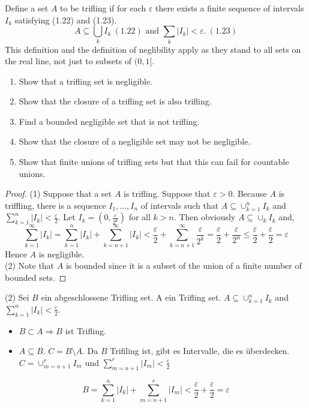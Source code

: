 \documentclass[11pt]{article}
\newcommand{\seq}{\subseteq}
\newcommand{\e}{\varepsilon}
\newcommand{\un}{\cup}
\newenvironment{exercise}[2][Exercise]{\begin{trivlist}
\item[\hskip \labelsep {\bfseries #1}\hskip \labelsep {\bfseries #2.}]}{\end{trivlist}}
\begin{document}
\begin{exercise}{1.3}
    Define a set $A$ to be trifling if for each $\e$ there exists a finite sequence of intervals $I_k$ satisfying (1.22) and (1.23).
    \[ A \seq \bigcup_{k} I_k \ (1.22) \text { and } \sum_{k} |I_k| < \e. \ (1.23) \]
    This definition and the definition of neglibility apply as they stand to all sets on the real line, not just to subsets of $(0, 1]$.
    \begin{enumerate}
        \item Show that a trifling set is negligible.
        \item Show that the closure of a trifling set is also trifling.
        \item Find a bounded negligible set that is not trifling.
        \item Show that the closure of a negligible set may not be negligible.
        \item Show that finite unions of trifling sets but that this can fail for countable unions.
    \end{enumerate}
\end{exercise}
\begin{proof}
    (1) Suppose that a set $A$ is trifling. Suppose that $\e > 0$. Because $A$ is triffling, there is a sequence $I_1, \ldots, I_n$ of intervals such that $A \seq \un_{k=1}^{n} I_k$ and $\sum_{k=1}^{n} |I_k| < \frac{\e}{2}$. Let $I_{k} = (0, \frac{\e}{2^{k}})$ for all $k > n$. Then obviously $A \seq \un_{k} I_k$ and,
    \[ \sum_{k=1}^{\infty} |I_k| = \sum_{k=1}^{n} |I_k| + \sum_{k=n+1}^{\infty} |I_k| < \frac{\e}{2}  + \sum_{k=n+1}^{\infty} \frac{\e}{2^{k}} = \frac{\e}{2} + \frac{\e}{2^{n}}  \leq \frac{\e}{2} + \frac{\e}{2} = \e    \]
    Hence $A$ is negligible. \\
    (2) Note that $A$ is bounded since it is a subset of the union of a finite number of bounded sets. 
\end{proof}
(2) Sei $B$ ein abgeschlossene Trifling set. A ein Trifling set.
$A \seq \un_{k=1}^{n} I_k$ and $\sum_{k=1}^{n} |I_k| < \frac{\e}{2}$.
\begin{itemize}
\item $B \subset A \Rightarrow B$ ist  Trifling.

\item $A \seq B$. $C=B\setminus A$. Da $B$ Trifiling ist, gibt es Intervalle, die es überdecken. $ C =\un_{m=n+1}^{r} I_m$  und $\sum_{m=n+1}^{r} |I_m| < \frac{\e}{2}$
\end{itemize}
\[ B = \sum_{k=1}^{n} |I_k| + \sum_{m=n+1}^{r} |I_m| < \frac{\e}{2}+ \frac{\e}{2}= \e \]
\end{document}
